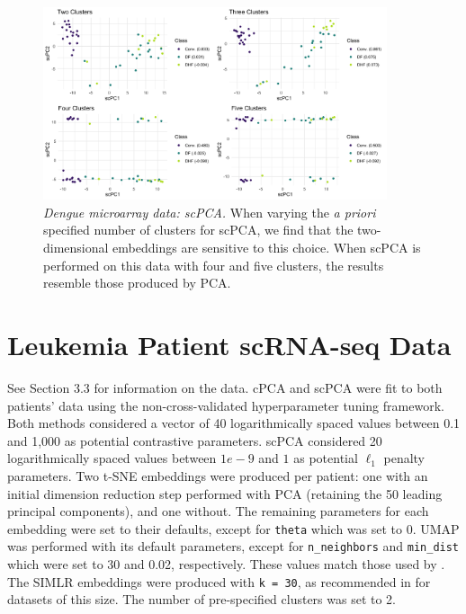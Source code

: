\documentclass{article}
\begin{document}
\begin{figure}[!htbp]
    \centering
    \includegraphics[width=0.9\textwidth]{figures/dengue_scpca_centers}
    \caption{
    {\em Dengue microarray data: scPCA.}
    When varying the \textit{a priori} specified number of clusters for scPCA, we find that the two-dimensional embeddings are sensitive to this choice. When scPCA is performed on this data with four and five clusters, the results resemble those produced by PCA.}
    \label{fig:dengue_scpca_centers}
\end{figure}

\FloatBarrier

\newpage

\section{Leukemia Patient scRNA-seq Data}\label{sup_aml}

See Section 3.3 %
for information on the data. cPCA and scPCA were fit to both patients' data using the non-cross-validated hyperparameter tuning framework. Both methods considered a vector of 40 logarithmically spaced values between 0.1 and 1,000 as potential contrastive parameters. scPCA considered 20 logarithmically spaced values between $1e-9$ and $1$ as potential $\ell_1$ penalty parameters. Two t-SNE embeddings were produced per patient: one with an initial dimension reduction step performed with PCA (retaining the 50 leading principal components), and one without. The remaining parameters for each embedding were set to their defaults, except for \texttt{theta} which was set to 0. UMAP was performed with its default parameters, except for \texttt{n\_neighbors} and \texttt{min\_dist} which were set to 30 and 0.02, respectively. These values match those used by \citet{Becht2019}. The SIMLR embeddings were produced with \texttt{k = 30}, as recommended in \citet{Wang2017} for datasets of this size. The number of pre-specified clusters was set to 2.
\end{document}
